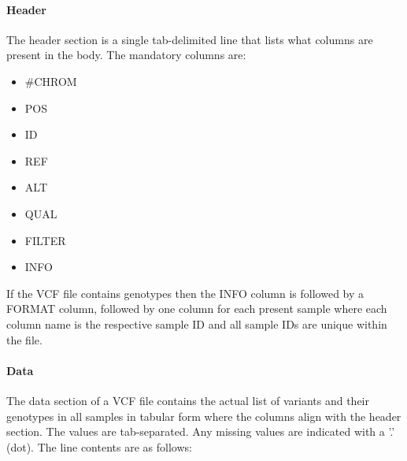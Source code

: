 \paragraph{Header}
The header section is a single tab-delimited line that lists what columns are present in the body. The mandatory columns are:
\begin{itemize}
    \item \#CHROM
    \item POS
    \item ID
    \item REF
    \item ALT
    \item QUAL
    \item FILTER
    \item INFO
\end{itemize}

If the VCF file contains genotypes then the INFO column is followed by a FORMAT column, followed by one column for each present sample where each column name is the respective sample ID and all sample IDs are unique within the file.

\paragraph{Data}

The data section of a VCF file contains the actual list of variants and their genotypes in all samples in tabular form where the columns align with the header section. The values are tab-separated. Any missing values are indicated with a '.' (dot). The line contents are as follows:

